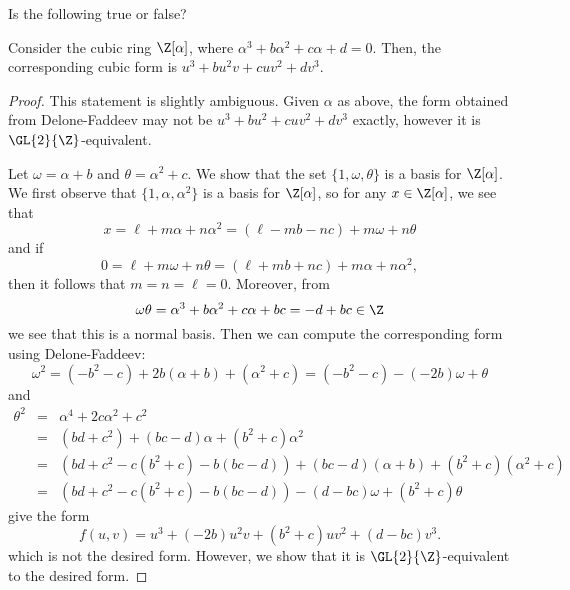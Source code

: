 \documentclass[10pt]{amsart}
\begin{document}
\begin{thm}
  Is the following true or false?
  
  Consider the cubic ring $\Z[\alpha]$, where $\alpha^3 + b\alpha^2 + c\alpha + d = 0$.
  Then, the corresponding cubic form is $u^3 + bu^2v + cuv^2 + dv^3$.
  
  \begin{proof}
    This statement is slightly ambiguous.
    Given $\alpha$ as above, the form obtained from Delone-Faddeev may not be $u^3 + bu^2 + cuv^2 + dv^3$ exactly, however it is $\GL{2}{\Z}$-equivalent.
    
    Let $\omega = \alpha + b$ and $\theta = \alpha^2 + c$.
    We show that the set $\{1, \omega, \theta\}$ is a basis for $\Z[\alpha]$.
    We first observe that $\{1, \alpha, \alpha^2\}$ is a basis for $\Z[\alpha]$, so for any $x \in \Z[\alpha]$, we see that
    $$x = \ell + m\alpha + n\alpha^2 = (\ell - mb - nc) + m\omega + n\theta$$
    and if
    $$0 = \ell + m\omega + n\theta = (\ell + mb + nc) + m\alpha + n\alpha^2,$$
    then it follows that $m = n = \ell = 0$.
    Moreover, from
    $$\omega\theta = \alpha^3 + b\alpha^2 + c\alpha + bc = -d + bc \in \Z$$
    we see that this is a normal basis.
    Then we can compute the corresponding form using Delone-Faddeev:
    $$\omega^2 = (-b^2 - c) + 2b(\alpha + b) + (\alpha^2 + c) = (-b^2 - c) - (-2b)\omega + \theta$$
    and
    \begin{eqnarray*}
      \theta^2 &=& \alpha^4 + 2c\alpha^2 + c^2\\
      &=& (bd + c^2) + (bc - d)\alpha + (b^2 + c)\alpha^2\\
      &=& (bd + c^2 - c(b^2 + c) - b(bc - d)) + (bc - d)(\alpha + b) + (b^2 + c)(\alpha^2 + c)\\
      &=& (bd + c^2 - c(b^2 + c) - b(bc - d)) - (d - bc)\omega + (b^2 + c)\theta
    \end{eqnarray*}
    give the form
    $$f(u,v) = u^3 + (-2b)u^2v + (b^2 + c)uv^2 + (d - bc)v^3.$$
    which is not the desired form.
    However, we show that it is $\GL{2}{\Z}$-equivalent to the desired form.
    

\end{proof}
\end{thm}
\end{document}
